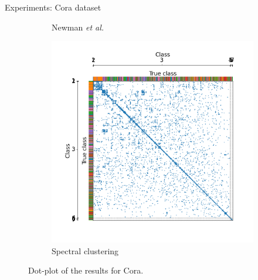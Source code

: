 \documentclass[final]{beamer}
\newlength{\colwidth}
\begin{document}
\begin{frame}[t]
\begin{columns}[t]
\begin{column}{\colwidth}
\begin{block}{Experiments: Cora dataset}
\begin{figure}[H]
\begin{subfigure}{0.36\linewidth}
            \caption{Newman \textit{et al.}}
            \label{fig:cora_newman}
          \end{subfigure}
          \hspace{1em}
          \begin{subfigure}{0.36\linewidth}
            \centering
            \includegraphics[width=\linewidth, trim={45 25 35 40}, clip]{figures/cora_spetral.png}
            \caption{Spectral clustering}
            \label{fig:cora_spectral}
          \end{subfigure}
          \hfill
          \caption{Dot-plot of the results for Cora.}
          \label{fig:cora_results}
        \end{figure}


\end{block}
\end{column}
\end{columns}
\end{frame}
\end{document}
